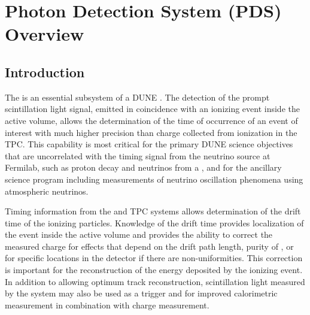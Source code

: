 \section{Photon Detection System (PDS) Overview}
\label{sec:fdsp-pd-ov}


\subsection{Introduction}
\label{sec:fdsp-pd-intro}


The  is an essential subsystem of a DUNE . The detection of the prompt scintillation light signal, emitted in coincidence with an ionizing event inside the active volume, allows the determination of the time of occurrence of an event of interest with much higher precision than charge collected from ionization in the TPC. This capability is most critical for the primary DUNE science objectives that are uncorrelated with the timing signal from the neutrino source at Fermilab, such as proton decay and neutrinos from a , %
and for the ancillary science program including measurements of neutrino oscillation phenomena using atmospheric neutrinos.

Timing information from the  and TPC systems allows determination of the drift time of the ionizing particles. Knowledge of the drift time provides localization of the event inside the active volume and provides the ability to correct the measured charge for effects that depend on the drift path length, purity of \lar, or for specific locations in the detector if there are non-uniformities.  This correction is important for the reconstruction of the energy deposited by the ionizing event. In addition to allowing optimum track reconstruction, scintillation light measured by the system may also be used as a trigger and for improved calorimetric measurement in combination with charge measurement.

